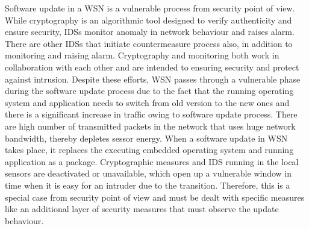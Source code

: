 \documentclass[conference,final]{IEEEtran}
\begin{document}
Software update in a WSN is a vulnerable process from security point of view.
While cryptography  is an algorithmic  tool designed to verify authenticity and ensure security, IDSs  monitor anomaly in network behaviour  and raises alarm. 
There are other IDSs that initiate  countermeasure process also, in addition to monitoring and raising alarm. 
Cryptography and monitoring both work in collaboration with each other and are intended to ensuring security and protect  against intrusion.
Despite these efforts, WSN passes through a vulnerable phase during the software update process due to the fact that the running operating system and application needs to switch from old version to the new ones and there is a significant increase in traffic owing to software update process.
There are high number of transmitted packets in the network that uses huge network bandwidth, thereby depletes sessor energy.
When a software update in WSN takes place, it replaces the executing embedded operating system and running application as a package.
Cryptographic measures and IDS running in the local sensors are deactivated or unavailable, which open up a vulnerable  window in time when it is easy for an intruder due to the transition.
Therefore, this is a special case from security point of view and must be dealt with specific measures like an additional layer of security measures that must observe the update behaviour. 

\end{document}
